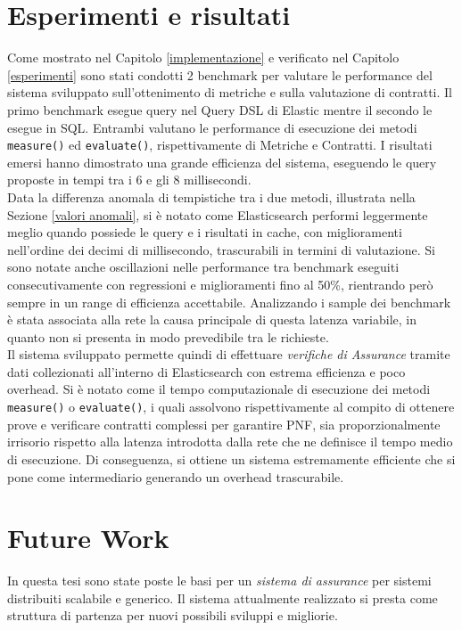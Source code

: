 \section{Esperimenti e risultati}
Come mostrato nel Capitolo \ref{implementazione} e verificato nel Capitolo \ref{esperimenti} sono stati condotti 2 benchmark per valutare le performance del sistema sviluppato sull'ottenimento di metriche e sulla valutazione di contratti. Il primo benchmark esegue query nel Query \gls{DSL} di Elastic mentre il secondo le esegue in SQL.
Entrambi valutano le performance di esecuzione dei metodi \texttt{measure()} ed \texttt{evaluate()}, rispettivamente di Metriche e Contratti.
I risultati emersi hanno dimostrato una grande efficienza del sistema, eseguendo le query proposte in tempi tra i 6 e gli 8 millisecondi. \\
Data la differenza anomala di tempistiche tra i due metodi, illustrata nella Sezione \ref{valori anomali}, si è notato come Elasticsearch performi leggermente meglio quando possiede le query e i risultati in cache, con miglioramenti nell'ordine dei decimi di millisecondo, trascurabili in termini di valutazione.
Si sono notate anche oscillazioni nelle performance tra benchmark eseguiti consecutivamente con regressioni e miglioramenti fino al 50\%, rientrando però sempre in un range di efficienza accettabile. Analizzando i sample dei benchmark è stata associata alla rete la causa principale di questa latenza variabile, in quanto non si presenta in modo prevedibile tra le richieste.\\
Il sistema sviluppato permette quindi di effettuare \textit{verifiche di Assurance} tramite dati collezionati all'interno di Elasticsearch con estrema efficienza e poco overhead. Si è notato come il tempo computazionale di esecuzione dei metodi \texttt{measure()} o \texttt{evaluate()}, i quali assolvono rispettivamente al compito di ottenere prove e verificare contratti complessi per garantire \gls{PNF}, sia proporzionalmente irrisorio rispetto alla latenza introdotta dalla rete che ne definisce il tempo medio di esecuzione. Di conseguenza, si ottiene un sistema estremamente efficiente che si pone come intermediario generando un overhead trascurabile.


\section{Future Work}
In questa tesi sono state poste le basi per un \textit{sistema di assurance} per sistemi distribuiti scalabile e generico. Il sistema attualmente realizzato si presta come struttura di partenza per nuovi possibili sviluppi e migliorie.

